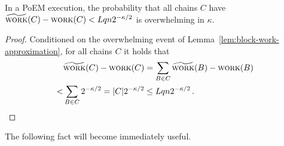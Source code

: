 \begin{corollary}\label{cor:chain-work-approximation}
  In a PoEM execution, the probability that all chains $C$
  have $\widetilde{\textsc{work}}(C) - \textsc{work}(C) < Lqn 2^{-\kappa/2}$
  is overwhelming in $\kappa$.
\end{corollary}
\begin{proof}
  Conditioned on the overwhelming event of Lemma~\ref{lem:block-work-approximation}, for all
  chains $C$ it holds that
  \begin{align*}
     &\widetilde{\textsc{work}}(C) - \textsc{work}(C) = \sum_{B \in C}{\widetilde{\textsc{work}}(B) - \textsc{work}(B)}\\
    <& \sum_{B \in C}{2^{-\kappa/2}} = |C| 2^{-\kappa/2} \leq Lqn 2^{-\kappa/2}\,.
  \end{align*}
  \Qed
\end{proof}

The following fact will become immediately useful.

